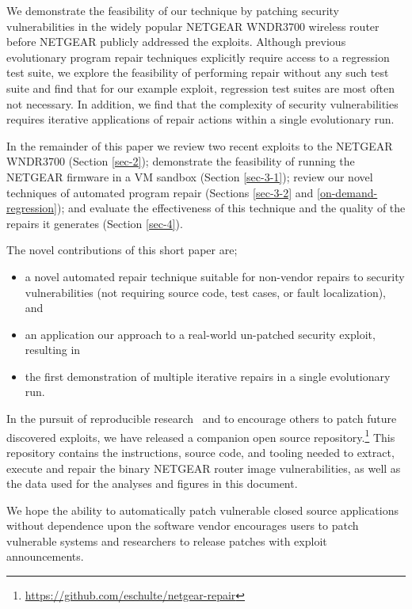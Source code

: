 \documentclass{sigcomm-alternate}
\begin{document}
We demonstrate the feasibility of our technique by patching security
vulnerabilities in the widely popular NETGEAR WNDR3700 wireless router
before NETGEAR publicly addressed the exploits.  Although previous
evolutionary program repair techniques explicitly require access to a
regression test suite, we explore the feasibility of performing repair
without any such test suite and find that for our example exploit,
regression test suites are most often not necessary. In addition, we find
that the complexity of security vulnerabilities requires iterative
applications of repair actions within a single evolutionary run. 

In the remainder of this paper we review two recent exploits to the
NETGEAR WNDR3700 (Section \ref{sec-2}); demonstrate the feasibility
of running the NETGEAR firmware in a VM sandbox (Section \ref{sec-3-1});
review our novel techniques of automated program repair (Sections
\ref{sec-3-2} and \ref{on-demand-regression}); and evaluate the effectiveness of this
technique and the quality of the repairs it generates (Section
\ref{sec-4}).

The novel contributions of this short paper are;
\begin{itemize}
\item a novel automated repair technique suitable for non-vendor repairs to
security vulnerabilities (not requiring source code, test cases, or fault
localization), and 
\item an application our approach to a real-world un-patched
security exploit, resulting in
\item the first demonstration of multiple iterative repairs in a single
evolutionary run.
\end{itemize}

In the pursuit of reproducible
research~\cite{buckheit1995wavelab,mesirov2010accessible} and to encourage
others to patch
future discovered exploits, we have released a companion open source
repository.\footnote{\url{https://github.com/eschulte/netgear-repair}}
This repository contains the instructions, source
code, and tooling needed to extract, execute and repair the binary
NETGEAR router image vulnerabilities, as well as the data used for the
analyses and figures in this document.

We hope the ability to automatically patch vulnerable closed source
applications without dependence upon the software vendor encourages
users to patch vulnerable systems and researchers to release patches
with exploit announcements.
\end{document}
